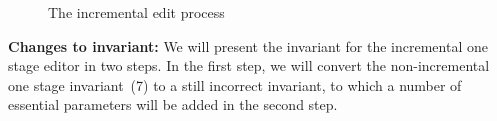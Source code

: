 \begin{figure}
\begin{small}
\begin{center}
\begin{center}
\begin{scriptsize}
\bigskip \noindent
{}
\end{scriptsize}
\end{center}\caption{ The incremental edit process}\label{inceditprocess} 
\end{center}
\end{small}
\end{figure}


{\bf Changes to invariant: }We will present the invariant for the incremental one stage editor in two steps. In the first step, we will convert the non-incremental one stage invariant~(7) to a still incorrect invariant, to which a number of essential parameters will be added in the second step.

